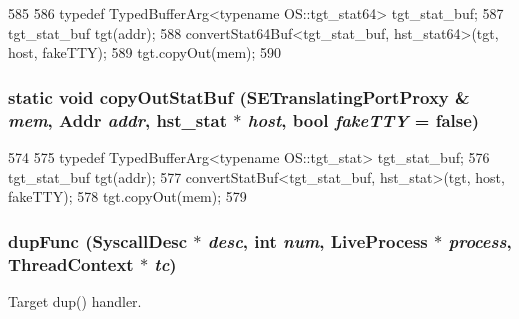 \begin{DoxyCode}
585 {
586     typedef TypedBufferArg<typename OS::tgt_stat64> tgt_stat_buf;
587     tgt_stat_buf tgt(addr);
588     convertStat64Buf<tgt_stat_buf, hst_stat64>(tgt, host, fakeTTY);
589     tgt.copyOut(mem);
590 }
\end{DoxyCode}
\hypertarget{syscall__emul_8hh_aad05317c6d15ac782ba87a36452232d6}{
\subsubsection[{copyOutStatBuf}]{\setlength{\rightskip}{0pt plus 5cm}static void copyOutStatBuf ({\bf SETranslatingPortProxy} \& {\em mem}, \/  {\bf Addr} {\em addr}, \/  {\bf hst\_\-stat} $\ast$ {\em host}, \/  bool {\em fakeTTY} = {\ttfamily false})}}
\label{syscall__emul_8hh_aad05317c6d15ac782ba87a36452232d6}



\begin{DoxyCode}
574 {
575     typedef TypedBufferArg<typename OS::tgt_stat> tgt_stat_buf;
576     tgt_stat_buf tgt(addr);
577     convertStatBuf<tgt_stat_buf, hst_stat>(tgt, host, fakeTTY);
578     tgt.copyOut(mem);
579 }
\end{DoxyCode}
\hypertarget{syscall__emul_8hh_a56b6a187c0e6aa20f278735a8d555dbd}{
\subsubsection[{dupFunc}]{ dupFunc ({\bf SyscallDesc} $\ast$ {\em desc}, \/  int {\em num}, \/  {\bf LiveProcess} $\ast$ {\em process}, \/  {\bf ThreadContext} $\ast$ {\em tc})}}
\label{syscall__emul_8hh_a56b6a187c0e6aa20f278735a8d555dbd}


Target dup() handler. 


